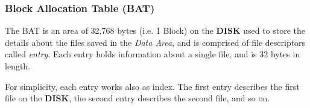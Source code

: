         \subsubsection{Block Allocation Table (BAT)}
        The BAT is an area of 32,768 bytes (i.e. 1 Block) on the \textbf{DISK}
        used to store the  details about the files saved in the \textit{Data
        Area}, and is comprised of file descriptors called \textit{entry}. Each
        entry holds information about a single file, and is 32 bytes in length.

        For simplicity, each entry works also as index. The first entry 
        describes the first file on the \textbf{DISK}, the second entry 
        describes the second file, and so on. 

